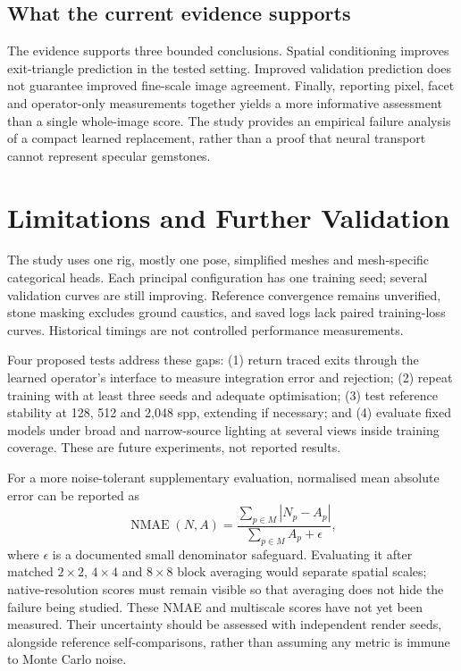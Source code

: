 \documentclass[conference]{IEEEtran}
\begin{document}
\subsection{What the current evidence supports}
The evidence supports three bounded conclusions. Spatial conditioning improves
exit-triangle prediction in the tested setting. Improved validation prediction
does not guarantee improved fine-scale image agreement. Finally, reporting
pixel, facet and operator-only measurements together yields a more informative
assessment than a single whole-image score. The study provides an empirical
failure analysis of a compact learned replacement, rather than a proof that
neural transport cannot represent specular gemstones.

\section{Limitations and Further Validation}
\label{sec:limits}
The study uses one rig, mostly one pose, simplified meshes and mesh-specific
categorical heads. Each principal configuration has one training seed; several
validation curves are still improving. Reference convergence remains unverified,
stone masking excludes ground caustics, and saved logs lack paired training-loss
curves. Historical timings are not controlled performance measurements.

Four proposed tests address these gaps: (1) return traced exits through the
learned operator's interface to measure integration error and rejection;
(2) repeat training with at least three seeds and adequate optimisation;
(3) test reference stability at 128, 512 and 2,048 spp, extending if necessary;
and (4) evaluate fixed models under broad and narrow-source lighting at several
views inside training coverage. These are future experiments, not reported
results.

For a more noise-tolerant supplementary evaluation, normalised mean absolute
error can be reported as
\begin{equation}
 \operatorname{NMAE}(N,A)=
 \frac{\sum_{p\in M}|N_p-A_p|}{\sum_{p\in M}A_p+\epsilon},
\end{equation}
where $\epsilon$ is a documented small denominator safeguard. Evaluating it
after matched $2\times2$, $4\times4$ and $8\times8$ block averaging would
separate spatial scales; native-resolution scores must remain visible so that
averaging does not hide the failure being studied. These NMAE and multiscale
scores have not yet been measured. Their uncertainty should be assessed with
independent render seeds, alongside reference self-comparisons, rather than
assuming any metric is immune to Monte Carlo noise.
\end{document}
